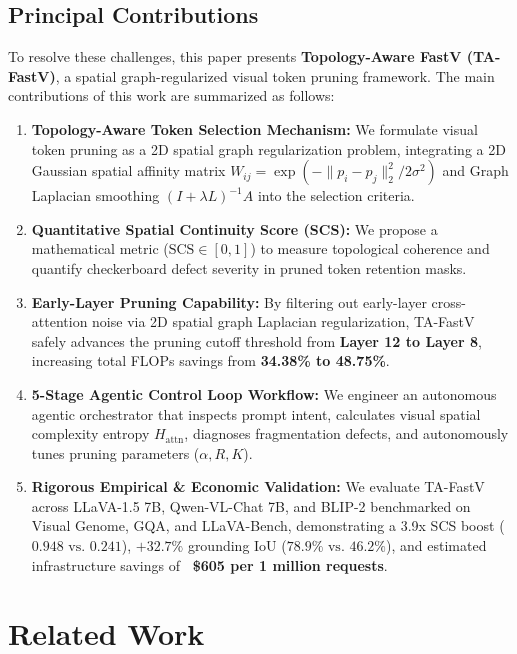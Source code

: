 \documentclass[conference]{IEEEtran}
\begin{document}
\subsection{Principal Contributions}
To resolve these challenges, this paper presents \textbf{Topology-Aware FastV (TA-FastV)}, a spatial graph-regularized visual token pruning framework. The main contributions of this work are summarized as follows:
\begin{enumerate}
    \item \textbf{Topology-Aware Token Selection Mechanism:} We formulate visual token pruning as a 2D spatial graph regularization problem, integrating a 2D Gaussian spatial affinity matrix $W_{ij} = \exp(-\|p_i - p_j\|_2^2 / 2\sigma^2)$ and Graph Laplacian smoothing $(I + \lambda L)^{-1} A$ into the selection criteria.
    \item \textbf{Quantitative Spatial Continuity Score (SCS):} We propose a mathematical metric ($\text{SCS} \in [0, 1]$) to measure topological coherence and quantify checkerboard defect severity in pruned token retention masks.
    \item \textbf{Early-Layer Pruning Capability:} By filtering out early-layer cross-attention noise via 2D spatial graph Laplacian regularization, TA-FastV safely advances the pruning cutoff threshold from \textbf{Layer 12 to Layer 8}, increasing total FLOPs savings from \textbf{34.38\% to 48.75\%}.
    \item \textbf{5-Stage Agentic Control Loop Workflow:} We engineer an autonomous agentic orchestrator that inspects prompt intent, calculates visual spatial complexity entropy $H_{\text{attn}}$, diagnoses fragmentation defects, and autonomously tunes pruning parameters ($\alpha, R, K$).
    \item \textbf{Rigorous Empirical \& Economic Validation:} We evaluate TA-FastV across LLaVA-1.5 7B, Qwen-VL-Chat 7B, and BLIP-2 benchmarked on Visual Genome, GQA, and LLaVA-Bench, demonstrating a 3.9x SCS boost ($0.948 \text{ vs. } 0.241$), $+32.7\%$ grounding IoU ($78.9\% \text{ vs. } 46.2\%$), and estimated infrastructure savings of \textbf{~\$605 per 1 million requests}.
\end{enumerate}

\section{Related Work}
\end{document}
